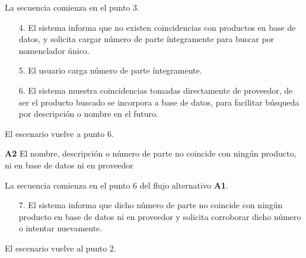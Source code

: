 La secuencia comienza en el punto 3.

\begin{enumerate}
	\item[4.] El sistema informa que no existen coincidencias con productos en base de datos,
	y solicita cargar número de parte íntegramente para buscar por nomenclador único.
	\item[5.] El usuario carga número de parte íntegramente.
	\item[6.] El sistema muestra coincidencias tomadas directamente de proveedor,
	de ser el producto buscado se incorpora a base de datos,
	para facilitar búsqueda por descripción o nombre en el futuro.
\end{enumerate}

El escenario vuelve a punto 6.

\textbf{A2} El nombre, descripción o número de parte no coincide con ningún producto, ni en base de datos ni en proveedor

La secuencia comienza en el punto 6 del flujo alternativo \textbf{A1}.

\begin{enumerate}
	\item [7.] El sistema informa que dicho número de parte no coincide con ningún producto en base de datos ni en proveedor y solicita corroborar dicho número o intentar nuevamente.
\end{enumerate}

El escenario vuelve al punto 2.


